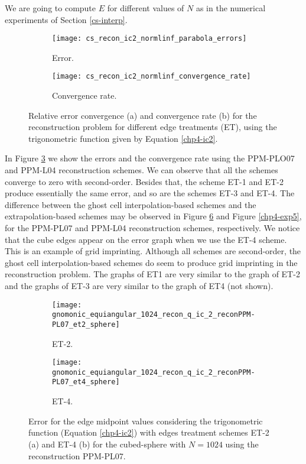 We are going to compute $E$ for different values of $N$ as in the numerical experiments of Section \ref{cs-interp}.
\begin{figure}[!htb]
	\centering
	\begin{subfigure}{0.45\textwidth}
		\centering
		\texttt{[image: cs\_recon\_ic2\_normlinf\_parabola\_errors]}
		\caption{Error.\label{chp4-exp3-error}}
	\end{subfigure}
	\begin{subfigure}{0.45\textwidth}
		\centering
		\texttt{[image: cs\_recon\_ic2\_normlinf\_convergence\_rate]}
		\caption{Convergence rate.\label{chp4-exp3-CR}}
	\end{subfigure}
	\caption{Relative error convergence (a) and convergence rate (b) for the reconstruction problem for different
	edge treatments (ET), using the trigonometric function given by Equation \eqref{chp4-ic2}.\label{chp4-exp3}}
\end{figure}

In Figure \ref{chp4-exp3} we show the errors and the convergence rate using the PPM-PLO07 and PPM-L04 reconstruction schemes.
We can observe that all the schemes converge to zero with second-order.
Besides that, the scheme ET-1 and ET-2 produce essentially the same error, and so are the schemes ET-3 and ET-4.
The difference between the ghost cell interpolation-based schemes and the extrapolation-based schemes
may be observed in Figure \ref{chp4-exp4} and Figure \ref{chp4-exp5}, for the  PPM-PL07 and PPM-L04 reconstruction schemes,
respectively.
We notice that the cube edges appear on the error graph when we use the ET-4 scheme. This is an example of grid imprinting.
Although all schemes are second-order, the ghost cell interpolation-based schemes do seem to produce grid imprinting
in the reconstruction problem.
The graphs of ET1 are very similar to the graph of ET-2 and the graphs of ET-3 are very similar to the graph of ET4 (not shown).
\newpage
\begin{figure}[!htb]
	\centering
	\begin{subfigure}{0.49\textwidth}
		\centering
		\texttt{[image: gnomonic\_equiangular\_1024\_recon\_q\_ic\_2\_reconPPM-PL07\_et2\_sphere]}
		\caption{ET-2.\label{chp4-exp4-a}}
	\end{subfigure}
	\begin{subfigure}{0.49\textwidth}
		\centering
		\texttt{[image: gnomonic\_equiangular\_1024\_recon\_q\_ic\_2\_reconPPM-PL07\_et4\_sphere]}
		\caption{ET-4.\label{chp4-exp4-b}}
	\end{subfigure}
	\caption{Error for the edge midpoint values considering the trigonometric function (Equation \eqref{chp4-ic2})
		with edges treatment schemes ET-2 (a) and ET-4 (b) for the cubed-sphere with $N=1024$ using the reconstruction PPM-PL07.\label{chp4-exp4}}
\end{figure}

